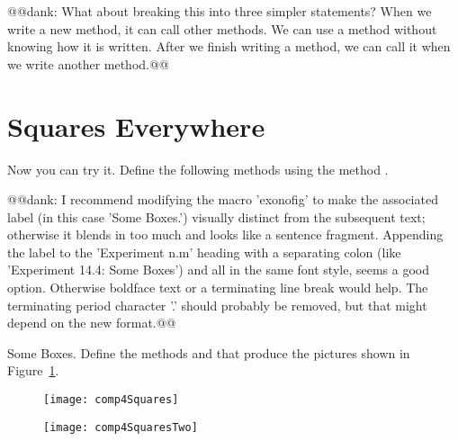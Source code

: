 @@dank: What about breaking this into three simpler statements?
When we write a new method, it can call other methods.
We can use a method without knowing how it is written.
After we finish writing a method, we can call it when we write another method.@@ 

\section{Squares Everywhere}
Now \newcommand{\replace}[2]{it is time for you to practice}{you can try it}. Define the following methods using the method .


@@dank: I recommend modifying the macro 'exonofig' to make the associated label (in this case 'Some Boxes.') visually distinct from the subsequent text; otherwise it blends in too much and looks like a sentence fragment.  Appending the label to the 'Experiment n.m' heading with a separating colon (like 'Experiment 14.4: Some Boxes') and all in the same font style, seems a good option.  Otherwise boldface text or a terminating line break would help.  The terminating period character '.' should probably be removed, but that might depend on the new format.@@  \begin{exonofig}{Some Boxes.}
Define the methods  and  that produce the 
pictures shown in Figure~\ref{c7groscarre}.
\end{exonofig}

\begin{figure}[!htbp]
\begin{minipage}[c]{.4\linewidth}
\centerline{\texttt{[image: comp4Squares]}}
\end{minipage}
\hfill
\begin{minipage}[c]{.4\linewidth}
\centerline{\texttt{[image: comp4SquaresTwo]}}
\end{minipage}
\label{c7groscarre}
\end{figure}
 


